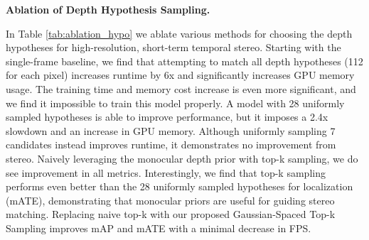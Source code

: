 \documentclass[runningheads, hyperfootnotes=false]{article}
\begin{document}
\noindent\textbf{Ablation of Depth Hypothesis Sampling.}
\begin{table*}
\centering
\captionsetup{aboveskip=0pt}\captionsetup{belowskip=0pt}
\label{tab:ablation_hypo}
\tiny
{}
\end{table*} In Table \ref{tab:ablation_hypo} we ablate various methods for choosing the depth hypotheses for high-resolution, short-term temporal stereo. Starting with the single-frame baseline, we find that attempting to match all depth hypotheses (112 for each pixel) increases runtime by 6x and significantly increases GPU memory usage. The training time and memory cost increase is even more significant, and we find it impossible to train this model properly. A model with 28 uniformly sampled hypotheses is able to improve performance, but it imposes a 2.4x slowdown and an increase in GPU memory. Although uniformly sampling 7 candidates instead improves runtime, it demonstrates no improvement from stereo. Naively leveraging the monocular depth prior with top-k sampling, we do see improvement in all metrics. Interestingly, we find that top-k sampling performs even better than the 28 uniformly sampled hypotheses for localization (mATE), demonstrating that monocular priors are useful for guiding stereo matching. Replacing naive top-k with our proposed Gaussian-Spaced Top-k Sampling improves mAP and mATE with a minimal decrease in FPS.
\end{document}
